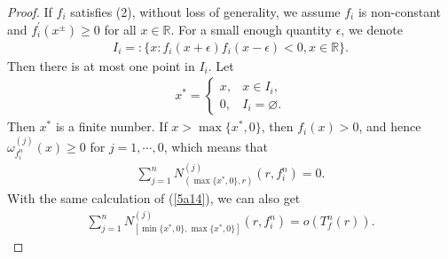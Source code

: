 \documentclass[10pt,a4paper]{amsart}
\begin{document}
\begin{proof}
    If $f_{i}$ satisfies (2), without loss of generality, we assume $f_{i}$ is non-constant and $f_{i}^{'}(x^{\pm})\geq 0$ for all $x\in\mathbb{R}$. For a small enough quantity $\epsilon$, we denote
    \begin{eqnarray*}
        I_{i}=:\{x:f_{i}(x+\epsilon)f_{i}(x-\epsilon)<0, x\in\mathbb{R}\}.
    \end{eqnarray*}
    Then there is at most one point in $I_{i}$. Let
    \begin{eqnarray*}
        x^{*}=\left\{\begin{array}{ll}
         x, & x\in I_{i},\\
         0, & I_{i}= \varnothing.
         \end{array}\right.
    \end{eqnarray*}
    Then $x^{*}$ is a finite number. If $x>\max\{x^{*}, 0\}$, then $f_{i}(x)>0$, and hence $\omega_{f_{i}^{n}}^{(j)}(x)\geq 0$ for $j=1, \cdots, 0$, which means that
    \begin{eqnarray}\label{5a15}
        \sum_{j=1}^{n}N_{(\max\{x^{*}, 0\}, r)}^{(j)}(r, f_{i}^{n})=0.
    \end{eqnarray}
    With the same calculation of (\ref{5a14}), we can also get 
    \begin{eqnarray}\label{5a16}
        \sum_{j=1}^{n}N_{[\min\{x^{*}, 0\}, \max\{x^{*}, 0\}]}^{(j)}(r, f_{i}^{n})=o(T_{f}^{n}(r)).
    \end{eqnarray}
    

\end{proof}
\end{document}
